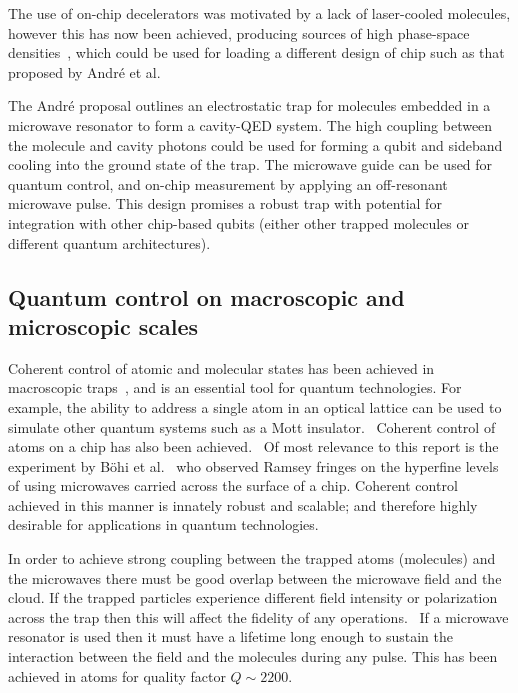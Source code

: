 %
The use of on-chip decelerators was motivated by a lack of laser-cooled
molecules, however this has now been achieved, producing sources of high
phase-space densities~\cite{Truppe2017}, which could be used for loading a
different design of chip such as that proposed by Andr\'e et
al.~\cite{Andre2006}

The Andr\'e proposal outlines an electrostatic trap for molecules embedded in a
microwave resonator to form a cavity-QED system. The high coupling between the
molecule and cavity photons could be used for forming a qubit and sideband
cooling into the ground state of the trap. The microwave guide can be used for
quantum control, and on-chip measurement by applying an off-resonant microwave
pulse. This design promises a robust trap with potential for integration with
other chip-based qubits (either other trapped molecules or different quantum
architectures).

\subsection{Quantum control on macroscopic and microscopic scales}
\label{litrev:control}


%
Coherent control of atomic and molecular states has been achieved in macroscopic
traps~\cite{Gross995, Blackmore_2018}, and is an essential tool for quantum
technologies. For example, the ability to address a single atom in an optical
lattice can be used to simulate other quantum systems such as a Mott
insulator.~\cite{Weitenberg2011} Coherent control of atoms on a chip has also
been achieved.~\cite{PhysRevLett.92.063601} Of most relevance to this report is
the experiment by B\"ohi et al.~\cite{Boehi2009} who observed Ramsey fringes on
the hyperfine levels of \esRb{} using microwaves carried across the surface of a
chip. Coherent control achieved in this manner is innately robust and scalable;
and therefore highly desirable for applications in quantum technologies.

%
In order to achieve strong coupling between the trapped atoms (molecules) and the
microwaves there must be good overlap between the microwave field and the cloud.
If the trapped particles experience different field intensity or polarization
across the trap then this will affect the fidelity of any
operations.~\cite{Williams2018} If a microwave resonator is used then it must
have a lifetime long enough to sustain the interaction between the field and the
molecules during any pulse. This has been achieved in atoms for quality factor
$Q\sim2200$.~\cite{Hattermann2017}

